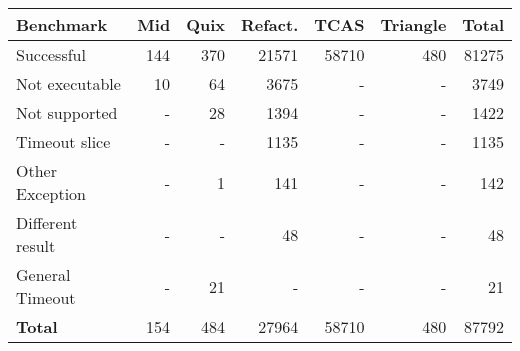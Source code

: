 \begin{tabular}{p{2cm}rrrrrr}
\toprule
\textbf{Benchmark} &  \textbf{Mid} &  \textbf{Quix} &  \textbf{Refact.} &  \textbf{TCAS} &  \textbf{Triangle} &  \textbf{Total} \\

\midrule
Successful                               &     144 &       370 &      21571 & 58710 &       480 &  81275 \\
Not executable                           &      10 &        64 &       3675 &     - &         - &   3749 \\
Not supported                            &       - &        28 &       1394 &     - &         - &   1422 \\
Timeout slice     &       - &         - &       1135 &     - &         - &   1135 \\
Other Exception                          &       - &         1 &        141 &     - &         - &    142 \\
Different result &       - &         - &         48 &     - &         - &     48 \\
General Timeout                          &       - &        21 &          - &     - &         - &     21 \\
\midrule
\textbf{Total}                           &     154 &       484 &      27964 & 58710 &       480 &  87792 \\
\bottomrule
\end{tabular}
